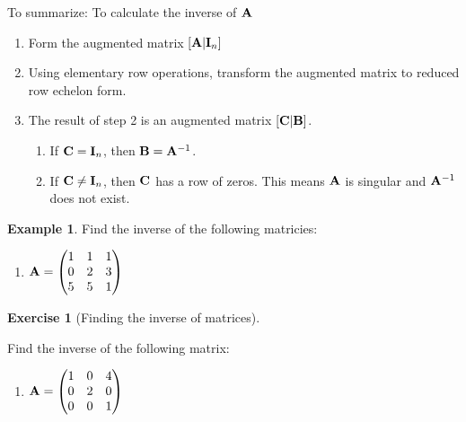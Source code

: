 \documentclass[
]{book}
\providecommand{\tightlist}{%
  \setlength{\itemsep}{0pt}\setlength{\parskip}{0pt}}
\theoremstyle{definition}
\theoremstyle{definition}
\newtheorem{example}{Example}[chapter]
\theoremstyle{definition}
\newtheorem{exercise}{Exercise}[chapter]
\theoremstyle{definition}
\theoremstyle{remark}
\begin{document}
To summarize: To calculate the inverse of \({\bf A}\)

\begin{enumerate}
\def\labelenumi{\arabic{enumi}.}
\item
  Form the augmented matrix \([ {\bf A} | {\bf I}_n]\)
\item
  Using elementary row operations, transform the augmented matrix to reduced row echelon form.
\item
  The result of step 2 is an augmented matrix \([ {\bf C} | {\bf B} ]\).

  \begin{enumerate}
  \def\labelenumii{\alph{enumii}.}
  \item
    If \({\bf C}={\bf I}_n\), then \({\bf B}={\bf A}^{-1}\).
  \item
    If \({\bf C}\ne{\bf I}_n\), then \(\bf C\) has a row of zeros. This means \({\bf A}\) is singular and \({\bf A}^{-1}\) does not exist.
  \end{enumerate}
\end{enumerate}

\begin{example}
\protect\hypertarget{exm:inverse}{}{\label{exm:inverse} }
Find the inverse of the following matricies:

\begin{enumerate}
\def\labelenumi{\arabic{enumi}.}
\tightlist
\item
  \({\bf A}=\begin{pmatrix} 1&1&1\\0&2&3\\5&5&1 \end{pmatrix}\)
\end{enumerate}
\end{example}

\begin{exercise}[Finding the inverse of matrices]
\protect\hypertarget{exr:inverse1}{}{\label{exr:inverse1} {} }

Find the inverse of the following matrix:

\begin{enumerate}
\def\labelenumi{\arabic{enumi}.}
\tightlist
\item
  \({\bf A}=\begin{pmatrix} 1&0&4\\0&2&0\\0&0&1 \end{pmatrix}\)
\end{enumerate}
\end{exercise}
\end{document}
